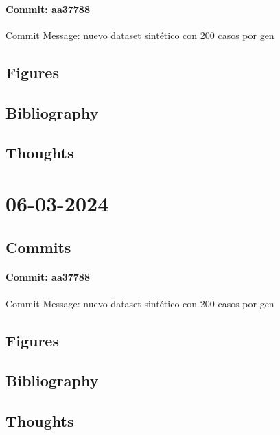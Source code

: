 \documentclass{article}
\begin{document}
\paragraph{Commit: aa37788}
Commit Message: nuevo dataset sintético con 200 casos por gen

\subsection{Figures}
\subsection{Bibliography}
\subsection{Thoughts}

\section{06-03-2024}
\subsection{Commits}
\paragraph{Commit: aa37788}
Commit Message: nuevo dataset sintético con 200 casos por gen

\subsection{Figures}
\subsection{Bibliography}
\subsection{Thoughts}
\end{document}
